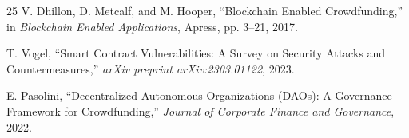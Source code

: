 \documentclass[conference]{IEEEtran}
\begin{document}
\begin{thebibliography}{25}
V. Dhillon, D. Metcalf, and M. Hooper, ``Blockchain Enabled Crowdfunding,'' in \textit{Blockchain Enabled Applications}, Apress, pp. 3--21, 2017.

T. Vogel, ``Smart Contract Vulnerabilities: A Survey on Security Attacks and Countermeasures,'' \textit{arXiv preprint arXiv:2303.01122}, 2023.

E. Pasolini, ``Decentralized Autonomous Organizations (DAOs): A Governance Framework for Crowdfunding,'' \textit{Journal of Corporate Finance and Governance}, 2022.

\end{thebibliography}
\end{document}
